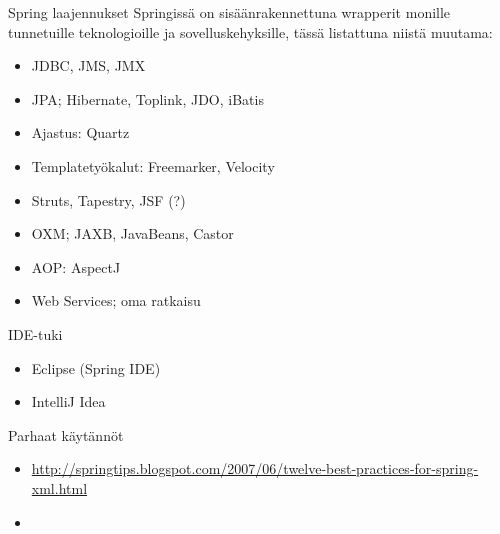 \documentclass[hyperref={pdfauthor=\AUTHOR},14pt]{beamer}
\begin{document}
\begin{frame}{Spring laajennukset}
Springissä on sisäänrakennettuna wrapperit monille tunnetuille
teknologioille ja sovelluskehyksille, tässä listattuna niistä muutama:
\begin{itemize}
\item JDBC, JMS, JMX
\item JPA; Hibernate, Toplink, JDO, iBatis
\item Ajastus: Quartz
\item Templatetyökalut: Freemarker, Velocity
\item Struts, Tapestry, JSF (?)
\item OXM; JAXB, JavaBeans, Castor 
\item AOP: AspectJ
\item Web Services; oma ratkaisu
\end{itemize}
\end{frame}

\begin{frame}{IDE-tuki}
\begin{itemize}
\item Eclipse (Spring IDE)
\item IntelliJ Idea
\end{itemize}
\end{frame}

\begin{frame}{Parhaat käytännöt}
\begin{itemize}
\item \url{http://springtips.blogspot.com/2007/06/twelve-best-practices-for-spring-xml.html}
\end{itemize}
\end{frame}

\begin{frame}{}
\begin{itemize}
\item 
\end{itemize}
\end{frame}
\end{document}
